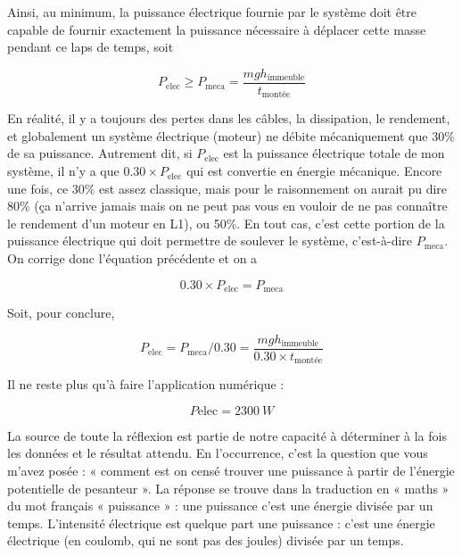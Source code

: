 \documentclass[../main/main.tex]{subfiles}
\begin{document}
Ainsi, au minimum, la puissance électrique fournie par le système doit être
capable de fournir exactement la puissance nécessaire à déplacer cette masse
pendant ce laps de temps, soit

\[P_\mathrm{elec} \geq P_\mathrm{meca} =
\frac{mgh_\mathrm{immeuble}}{t_\mathrm{montée}}\]

En réalité, il y a toujours des pertes dans les câbles, la dissipation, le
rendement, et globalement un système électrique (moteur) ne débite mécaniquement
que 30\% de sa puissance. Autrement dit, si $P_\mathrm{elec}$ est la puissance
électrique totale de mon système, il n'y a que $0.30\times P_\mathrm{elec}$ qui
est convertie en énergie mécanique. Encore une fois, ce 30\% est assez
classique, mais pour le raisonnement on aurait pu dire 80\% (ça n'arrive jamais
mais on ne peut pas vous en vouloir de ne pas connaître le rendement d'un moteur
en L1), ou 50\%. En tout cas, c'est cette portion de la puissance électrique qui
doit permettre de soulever le système, c'est-à-dire $P_\mathrm{meca}$. On
corrige donc l'équation précédente et on a

\[0.30\times P_\mathrm{elec} = P_\mathrm{meca}\]

Soit, pour conclure,

\[P_\mathrm{elec} = P_\mathrm{meca}/0.30 =
\frac{mgh_\mathrm{immeuble}}{0.30\times t_\mathrm{montée}}\]

Il ne reste plus qu'à faire l'application numérique :

\[ \boxed{P\mathrm{elec} = \SI{2300}{W}} \]

La source de toute la réflexion est partie de notre capacité à déterminer à la
fois les données et le résultat attendu. En l'occurrence, c'est la question que
vous m'avez posée : « comment est on censé trouver une puissance à partir de
l’énergie potentielle de pesanteur ». La réponse se trouve dans la traduction en
« maths » du mot français « puissance » : une puissance c'est une énergie
divisée par un temps. L'intensité électrique est quelque part une puissance :
c'est une énergie électrique (en coulomb, qui ne sont pas des joules) divisée
par un temps.
\end{document}

